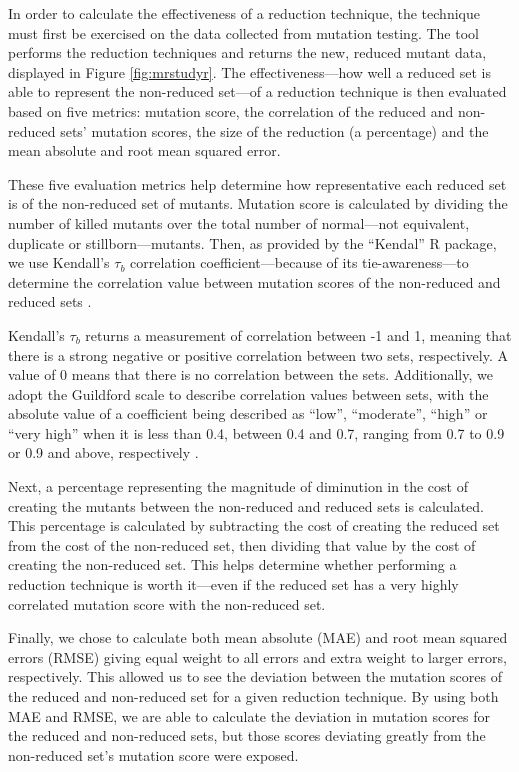 In order to calculate the effectiveness of a reduction technique, the technique
must first be exercised on the data collected from mutation testing. The \mr tool
performs the reduction techniques and returns the new, reduced mutant data,
displayed in Figure \ref{fig:mrstudyr}. The effectiveness---how well a reduced set is able to represent
the non-reduced set---of a reduction technique is then evaluated
based on five metrics: mutation score, the correlation of the reduced and non-reduced sets' mutation scores,
the size of the reduction (a percentage) and the mean absolute and root mean squared error.

These five evaluation metrics help determine how representative each reduced
set is of the non-reduced set of mutants. Mutation score is calculated
by dividing the number of killed mutants over the total number of normal---not
equivalent, duplicate or stillborn---mutants. Then, as provided by the ``Kendal'' R package,
we use Kendall's $\tau_b$ correlation coefficient---because of its tie-awareness---to
determine the correlation value between mutation scores of the non-reduced and reduced sets \cite{mcleod2005kendall}.

Kendall's $\tau_b$ returns a measurement of correlation between -1 and 1, meaning that
there is a strong negative or positive correlation between two sets, respectively. A value
of 0 means that there is no correlation between the sets. Additionally, we adopt the
Guildford scale to describe correlation values between sets, with the absolute value
of a coefficient being described as ``low'', ``moderate'', ``high'' or ``very high'' when
it is less than 0.4, between 0.4 and 0.7, ranging from 0.7 to 0.9 or 0.9 and above, respectively \cite{inozemtseva2014coverage}.

Next, a percentage representing the magnitude of diminution in the cost of creating the mutants between the non-reduced
and reduced sets is calculated. This percentage is calculated by subtracting
the cost of creating the reduced set from the cost of the non-reduced set, then
dividing that value by the cost of creating the non-reduced set. This helps
determine whether performing a reduction technique is worth it---even if the
reduced set has a very highly correlated mutation score with the non-reduced set.

Finally, we chose to calculate both mean absolute (MAE) and root mean squared errors (RMSE) giving equal weight to
all errors and extra weight to larger errors, respectively. This allowed
us to see the deviation between the mutation scores of the reduced and
non-reduced set for a given reduction technique. By using both MAE and RMSE,
we are able to calculate the deviation in mutation scores for the reduced and
non-reduced sets, but those scores deviating greatly from the non-reduced
set's mutation score were exposed.


